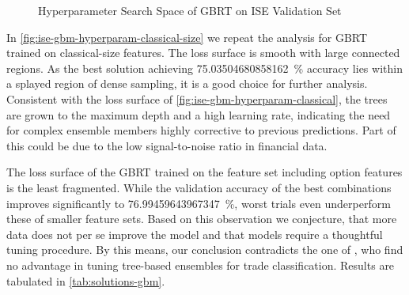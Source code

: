 \begin{figure}[!h]
\end{figure}
\clearpage
\begin{figure}[!ht]
    \addtocounter{figure}{-1}
    \vfill
    \caption[]{Hyperparameter Search Space of \gls{GBRT} on \gls{ISE} Validation Set}
    \label{fig:ise-gbm-hyperparam}
\end{figure}

In \cref{fig:ise-gbm-hyperparam-classical-size} we repeat the analysis for \gls{GBRT} trained on classical-size features. The loss surface is smooth with large connected regions. As the best solution achieving \SI{75.03504680858162}{\percent} accuracy lies within a splayed region of dense sampling, it is a good choice for further analysis. Consistent with the loss surface of \cref{fig:ise-gbm-hyperparam-classical}, the trees are grown to the maximum depth and a high learning rate, indicating the need for complex ensemble members highly corrective to previous predictions. Part of this could be due to the low signal-to-noise ratio in financial data.

The loss surface of the \gls{GBRT} trained on the feature set including option features is the least fragmented. While the validation accuracy of the best combinations improves significantly to \SI{76.99459643967347}{\percent}, worst trials even underperform these of smaller feature sets. Based on this observation we conjecture, that more data does not per se improve the model and that models require a thoughtful tuning procedure. By this means, our conclusion contradicts the one of \textcite[][14]{ronenMachineLearningTrade2022}, who find no advantage in tuning tree-based ensembles for trade classification. Results are tabulated in \cref{tab:solutions-gbm}.

